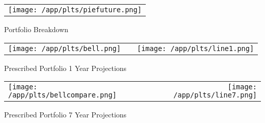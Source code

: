 \documentclass{article}
\begin{document}
\begin{adjustwidth}{-.3in}{0in}%
\vspace*{-1cm}

\begin{center}
  \begin{tabular}{c}
    \texttt{[image: /app/plts/piefuture.png]}
  \end{tabular}
  \end{center}

  \begin{center}
        Portfolio Breakdown
  \end{center}

\vspace{.7cm}


\begin{center}
  \begin{tabular}{lcr}
  \texttt{[image: /app/plts/bell.png]}
    & \hspace{1cm }&\texttt{[image: /app/plts/line1.png]}
  \end{tabular}
  \end{center}

  \begin{center}
      Prescribed Portfolio 1 Year Projections
  \end{center}

  \vspace{.7cm}


\begin{center}
  \begin{tabular}{lcr}
  \texttt{[image: /app/plts/bellcompare.png]}
    & \hspace{1cm }&\texttt{[image: /app/plts/line7.png]}
  \end{tabular}
  \end{center}

  \begin{center}
      Prescribed Portfolio 7 Year Projections
  \end{center}

\vspace{.6cm}

\end{adjustwidth}
\end{document}
